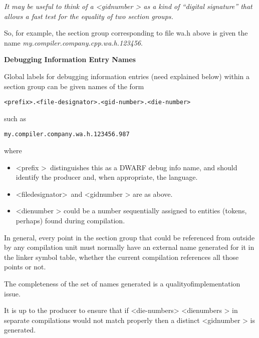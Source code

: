 \textit{It may be useful to think of a 
\textless gid\dash number \textgreater
as a kind
of ``digital signature'' that allows a fast test for the
equality of two section groups.}

So, for example, the section group corresponding to file wa.h
above is given the name \textit{my.compiler.company.cpp.wa.h.123456}.



\textbf{Debugging Information Entry Names}

Global labels for debugging information entries (need explained
below) within a section group can be given names of the form

\begin{alltt}
    <prefix>.<file-designator>.<gid-number>.<die-number>
\end{alltt}

such as

\begin{alltt}
    my.compiler.company.wa.h.123456.987
\end{alltt}

where
\begin{itemize}
\item \textless prefix \textgreater\  
distinguishes this as a DWARF debug info name, and should identify the producer
and, when appropriate, the language.
\item \textless file\dash designator\textgreater\  
and 
\textless gid\dash number \textgreater
are as above.

\item  \textless die\dash number \textgreater
could be a number sequentially assigned 
to entities (tokens, perhaps) found
during compilation.

\end{itemize}

In general, every point in the section group 
 that
could be referenced from outside by any compilation unit must
normally have an external name generated for it in the linker
symbol table, whether the current compilation references all
those points or not.

The completeness of the set of names generated is a
quality\dash of\dash implementation issue.

It is up to the producer to ensure that if 
<die-numbers>
\textless die\dash numbers \textgreater
in separate compilations would not match properly then a
distinct 
\textless gid\dash number \textgreater
is generated.

